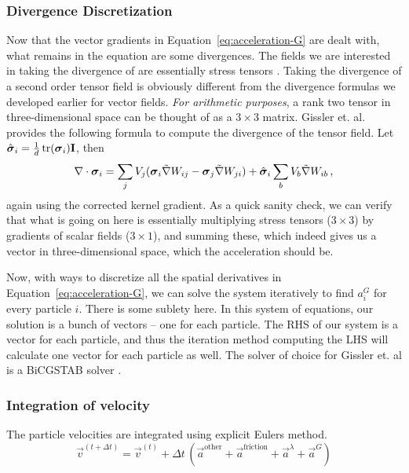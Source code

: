 \subsubsection*{Divergence Discretization}
Now that the vector gradients in Equation~\ref{eq:acceleration-G}
are dealt with, what remains in the equation are some divergences.
The fields we are interested in taking the divergence of
are essentially stress tensors \cite{icsph}.
Taking the divergence of a second order tensor field is obviously
different from the divergence formulas we developed earlier for vector fields.
{\em For arithmetic purposes}, a rank two tensor in three-dimensional space
can be thought of as a $3\times 3$ matrix.
Gissler et. al. provides the following formula \cite{icsph} to
compute the divergence of the tensor field.
Let $\hat{\bm{\mathrm \sigma}}_i = \frac 1 d \operatorname{tr}(\bm{\mathrm \sigma}_i) \bm{\mathrm I}$, then
\begin{equation}
    \label{eq:div-discr}
    \nabla \cdot \bm{\mathrm \sigma}_i
        = \sum_j V_j (\bm{\mathrm \sigma}_i \tilde\nabla W_{ij}
                    - \bm{\mathrm \sigma}_j \tilde\nabla W_{ji})
        + \hat{\bm{\mathrm \sigma}}_i \sum_b V_b \tilde\nabla W_{ib}
    \,\text,
\end{equation}
again using the corrected kernel gradient.
As a quick sanity check, we can verify that what is going on here
is essentially multiplying stress tensors ($3 \times 3$) by
gradients of scalar fields ($3 \times 1$), and summing these,
which indeed gives us a vector in three-dimensional space, which
the acceleration should be.

Now, with ways to discretize all the spatial derivatives in
Equation~\ref{eq:acceleration-G}, we can solve the system iteratively
to find $a^G_i$ for every particle $i$.
There is some sublety here.
In this system of equations, our solution is a bunch of vectors
-- one for each particle.
The RHS of our system is a vector for each particle, and thus
the iteration method computing the LHS will calculate one
vector for each particle as well.
The solver of choice for Gissler et. al is a BiCGSTAB solver
\cite{icsph}.

\subsubsection*{Integration of velocity}
The particle velocities are integrated using explicit Eulers method.
\begin{equation}
    \vec v^{(t + \Delta t)}
        = \vec v^{(t)}
        + \Delta t \, (\vec a^{\text{other}}
                     + \vec a^{\text{friction}}
                     + \vec a^\lambda
                     + \vec a^G)
\end{equation}


